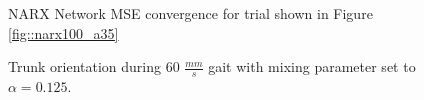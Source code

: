 				\begin{figure}[!h]
					\centering
					\caption{NARX Network MSE convergence for trial shown in Figure \ref{fig::narx100_a35}} 
					\label{fig::narx100_a35_nne}
				\end{figure}
				\begin{figure}
					\centering
					\caption{Trunk orientation during 60 $\frac{mm}{s}$ gait with mixing parameter set to $\alpha = 0.125$.}
					\label{fig::narx60_a125_nne}
				\end{figure}
